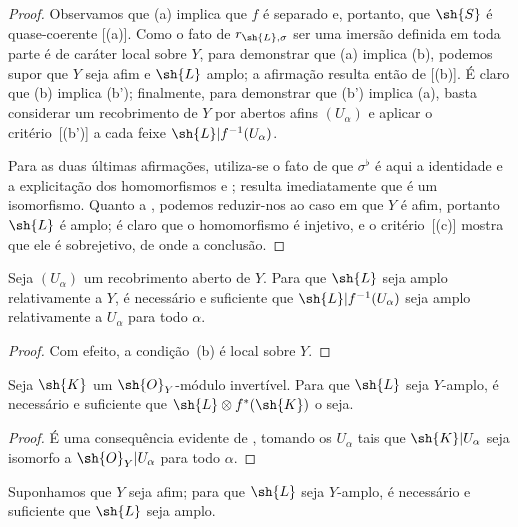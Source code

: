 \documentclass[oneside,10pt]{amsart}
\newcommand{\oldpage}[2][]{\marginnote{\normalfont\footnotesize\textbf{#1}~|~#2}\ignorespaces}
\let\EGAOriginalLabel\label
\renewcommand{\label}[1]{\phantomsection\EGAOriginalLabel{#1}}
\begin{document}
\begin{proof}
Observamos que (a) implica que $f$ é separado e, portanto, que $\sh{S}$ é quase-coerente [(a)].
Como o fato de $r_{\sh{L},\sigma}$ ser uma imersão definida em toda parte é de caráter local sobre $Y$, para demonstrar que (a) implica (b), podemos supor que $Y$ seja afim e $\sh{L}$ amplo;
\oldpage[II]{90}
a afirmação resulta então de [(b)].
É claro que (b) implica (b');
finalmente, para demonstrar que (b') implica (a), basta considerar um recobrimento de $Y$ por abertos afins $(U_\alpha)$ e aplicar o critério~[(b')] a cada feixe $\sh{L}|f^{-1}(U_\alpha)$.

Para as duas últimas afirmações, utiliza-se o fato de que $\sigma^\flat$ é aqui a identidade e a explicitação dos homomorfismos  e ;
resulta imediatamente que  é um isomorfismo.
Quanto a , podemos reduzir-nos ao caso em que $Y$ é afim, portanto $\sh{L}$ é amplo;
é claro que o homomorfismo  é injetivo, e o critério~[(c)] mostra que ele é sobrejetivo, de onde a conclusão.
\end{proof}

\begin{corollary}[4.6.4]
\label{II.4.6.4}
Seja $(U_\alpha)$ um recobrimento aberto de $Y$.
Para que $\sh{L}$ seja amplo relativamente a $Y$, é necessário e suficiente que $\sh{L}|f^{-1}(U_\alpha)$ seja amplo relativamente a $U_\alpha$ para todo $\alpha$.
\end{corollary}

\begin{proof}
Com efeito, a condição~(b) é local sobre $Y$.
\end{proof}

\begin{corollary}[4.6.5]
\label{II.4.6.5}
Seja $\sh{K}$ um $\sh{O}_Y$-módulo invertível.
Para que $\sh{L}$ seja $Y$-amplo, é necessário e suficiente que $\sh{L}\otimes f^*(\sh{K})$ o seja.
\end{corollary}

\begin{proof}
É uma consequência evidente de , tomando os $U_\alpha$ tais que $\sh{K}|U_\alpha$ seja isomorfo a $\sh{O}_Y|U_\alpha$ para todo $\alpha$.
\end{proof}

\begin{corollary}[4.6.6]
\label{II.4.6.6}
Suponhamos que $Y$ seja afim;
para que $\sh{L}$ seja $Y$-amplo, é necessário e suficiente que $\sh{L}$ seja amplo.
\end{corollary}
\end{document}
